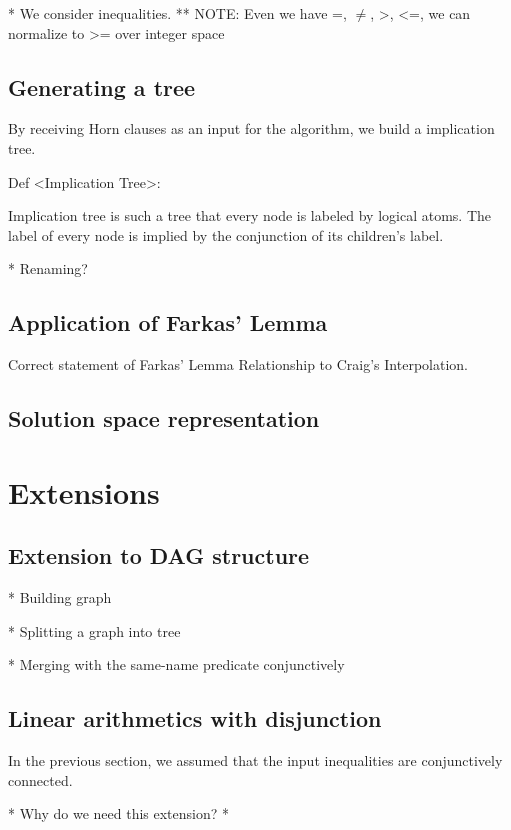 \documentclass{llncs}
\begin{document}
* We consider inequalities.
** NOTE: Even we have =, $\neq$, >, <=, we can normalize to >=
         over integer space



\subsection{Generating a tree}

By receiving Horn clauses as an input for the algorithm, we build a
implication tree.

Def <Implication Tree>:

Implication tree is such a tree that every node is labeled by logical
atoms. The label of every node is implied by the conjunction of its
children's label.


* Renaming?

\subsection{Application of Farkas' Lemma}

Correct statement of Farkas' Lemma
Relationship to Craig's Interpolation.

\subsection{Solution space representation}


\section{Extensions}

\subsection{Extension to DAG structure}

* Building graph

* Splitting a graph into tree

* Merging with the same-name predicate conjunctively

\subsection{Linear arithmetics with disjunction}

In the previous section, we assumed that the input inequalities are
conjunctively connected.

* Why do we need this extension? *
\end{document}
